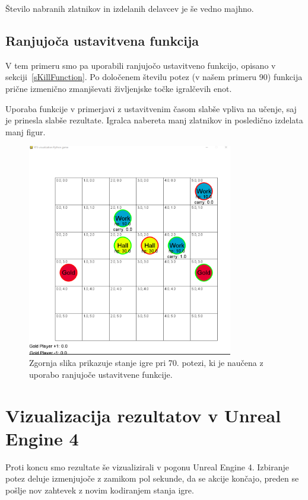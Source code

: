 \documentclass[a4paper, 12pt]{book}
\begin{document}
Število nabranih zlatnikov in izdelanih delavcev je še vedno majhno.

\subsection{Ranjujoča ustavitvena funkcija}

V tem primeru smo pa uporabili ranjujočo ustavitveno funkcijo, opisano v sekciji~\ref{sKillFunction}.
Po določenem številu potez (v našem primeru 90) funkcija prične izmenično zmanjševati življenjske točke igralčevih enot.

Uporaba funkcije v primerjavi z ustavitvenim časom slabše vpliva na učenje, saj je prinesla slabše rezultate.
Igralca nabereta manj zlatnikov in posledično izdelata manj figur.



\begin{figure}[h]
	\begin{center}
		\includegraphics[width=0.8\textwidth]{killFunction.pdf}
	\end{center}
	\caption{Zgornja slika prikazuje stanje igre pri 70. potezi, ki je naučena z uporabo ranjujoče ustavitvene funkcije.}
	\label{vizualizacijaRezultatovKillFunction}
\end{figure}

\section{Vizualizacija rezultatov v Unreal Engine 4}
Proti koncu smo rezultate še vizualizirali v pogonu Unreal Engine 4.
Izbiranje potez deluje izmenjujoče z zamikom pol sekunde, da se akcije končajo, preden se pošlje nov zahtevek z novim kodiranjem stanja igre.
\end{document}
